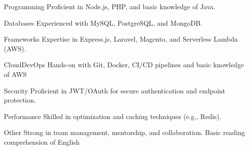 

\begin{cvskills}

  \cvskill
    {Programming} %
    {Proficient in Node.js, PHP, and basic knowledge of Java.} %

  \cvskill
    {Databases} %
    {Experienced with MySQL, PostgreSQL, and MongoDB.} %

  \cvskill
    {Frameworks} %
    {Expertise in Express.js, Laravel, Magento, and Serverless Lambda (AWS).} %

  \cvskill
    {CloudDevOps} %
    {Hands-on with Git, Docker, CI/CD pipelines and basic knowledge of AWS} %

  \cvskill
    {Security} %
    {Proficient in JWT/OAuth for secure authentication and endpoint protection.} %

  \cvskill
    {Performance} %
    { Skilled in optimization and caching techniques (e.g., Redis).} %

  \cvskill
    {Other} %
    {Strong in team management, mentorship, and collaboration. Basic reading comprehension of English} %

\end{cvskills}

